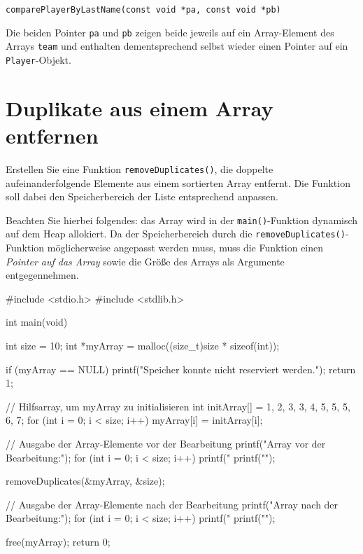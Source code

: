 \noindent\texttt{comparePlayerByLastName(const void *pa, const void *pb)}

Die beiden Pointer \texttt{pa} und \texttt{pb} zeigen beide
jeweils auf ein Array-Element des Arrays \texttt{team} und enthalten
dementsprechend selbst wieder einen Pointer auf ein
\texttt{Player}-Objekt.




\chapter{Duplikate aus einem Array entfernen}

\vspace{10pt}

Erstellen Sie eine Funktion \texttt{removeDuplicates()}, die doppelte
aufeinanderfolgende Elemente aus einem sortierten Array entfernt. Die Funktion
soll dabei den Speicherbereich der Liste entsprechend anpassen.

Beachten Sie hierbei folgendes: das Array wird in der
\texttt{main()}-Funktion dynamisch auf dem Heap allokiert. Da der
Speicherbereich durch die \texttt{removeDuplicates()}-Funktion
möglicherweise angepasst werden muss, muss die Funktion einen \textit{Pointer
auf das Array} sowie die Größe des Arrays als Argumente entgegennehmen.

\Vorlage
\begin{codebox}[lang=c, fontsize=\small]
#include <stdio.h>
#include <stdlib.h>

int main(void) {
    int size = 10;
    int *myArray = malloc((size_t)size * sizeof(int));

    if (myArray == NULL) {
        printf("Speicher konnte nicht reserviert werden.\n");
        return 1;
    }

    // Hilfsarray, um myArray zu initialisieren
    int initArray[] = {1, 2, 3, 3, 4, 5, 5, 5, 6, 7};
    for (int i = 0; i < size; i++) {
        myArray[i] = initArray[i];
    }

    // Ausgabe der Array-Elemente vor der Bearbeitung
    printf("Array vor der Bearbeitung:\n");
    for (int i = 0; i < size; i++) {
        printf("%
    }
    printf("\n");

    removeDuplicates(&myArray, &size);

    // Ausgabe der Array-Elemente nach der Bearbeitung
    printf("Array nach der Bearbeitung:\n");
    for (int i = 0; i < size; i++) {
        printf("%
    }
    printf("\n");

    free(myArray);
    return 0;
}
\end{codebox}

